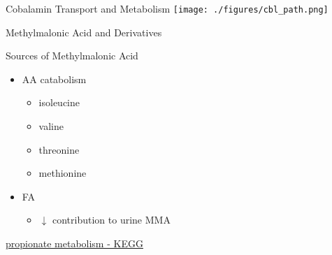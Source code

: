 \documentclass[presentation, smaller]{beamer}
\begin{document}
\begin{frame}[label={sec:orgheadline7}]{Cobalamin Transport and Metabolism}
\texttt{[image: ./figures/cbl\_path.png]}
\end{frame}

\begin{frame}[label={sec:orgheadline8}]{Methylmalonic Acid and Derivatives}
\centering
\vspace{6em}
\hspace{2em}
\hspace{2em}
\end{frame}

\begin{frame}[label={sec:orgheadline9}]{Sources of Methylmalonic Acid}
\begin{itemize}
\item AA catabolism
\begin{itemize}
\item isoleucine
\item valine
\item threonine
\item methionine
\end{itemize}
\item FA
\begin{itemize}
\item \(\downarrow\) contribution to urine MMA
\end{itemize}
\end{itemize}

\href{http://www.genome.jp/kegg-bin/show_pathway?scale=1.0&query=methylmalonyl-CoA&map=hsa00640&scale=&auto_image=&show_description=hide&multi_query=}{propionate metabolism - KEGG}
\end{frame}
\end{document}

